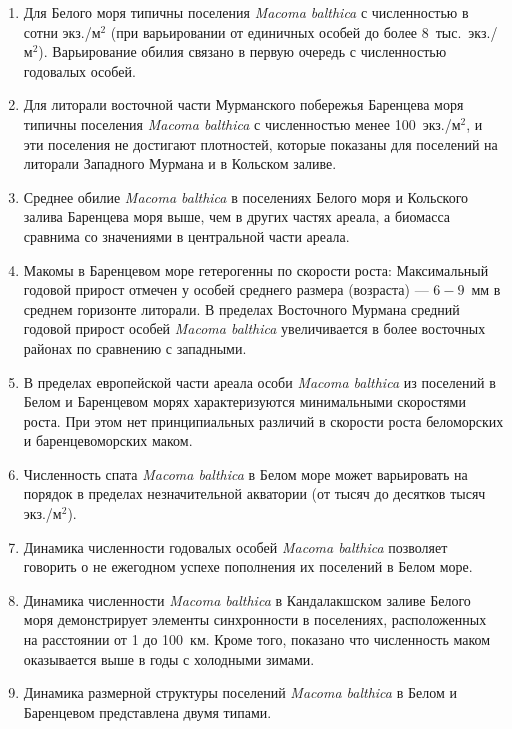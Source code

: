 	\begin{enumerate}
		\item Для Белого моря типичны поселения {\it Macoma balthica} с численностью в сотни экз./м$^2$ (при варьировании от единичных особей до более $8$~тыс.~экз./м$^2$). Варьирование обилия связано в первую очередь с численностью годовалых особей.
		\item Для литорали восточной части Мурманского побережья Баренцева моря типичны поселения {\it Macoma balthica} с численностью  менее 100~экз./м$^2$, и эти поселения не достигают плотностей, которые показаны для поселений на литорали Западного Мурмана и в Кольском заливе. %
		\item Среднее обилие {\it Macoma balthica} в поселениях Белого моря и Кольского залива Баренцева моря выше, чем в других частях ареала, а биомасса сравнима со значениями в центральной части ареала. 
		\item Макомы в Баренцевом море гетерогенны по скорости роста: Максимальный годовой прирост отмечен у особей среднего размера (возраста) --- $6 - 9$~мм в среднем горизонте литорали. В пределах Восточного Мурмана средний годовой прирост особей {\it Macoma balthica} увеличивается в более восточных районах по сравнению с западными.
		\item В пределах европейской части ареала особи {\it Macoma balthica} из поселений в Белом и Баренцевом морях характеризуются минимальными скоростями роста. При этом нет принципиальных различий в скорости роста беломорских и баренцевоморских маком.
		\item Численность спата {\it Macoma balthica} в Белом море может варьировать на порядок в пределах незначительной акватории (от тысяч до десятков тысяч экз./м$^2$).
		\item Динамика численности годовалых особей {\it Macoma balthica} позволяет говорить о не ежегодном успехе пополнения их поселений в Белом море.
		\item Динамика численности {\it Macoma balthica} в Кандалакшском заливе Белого моря демонстрирует элементы синхронности в поселениях, расположенных на расстоянии от 1 до 100~км. Кроме того, показано что численность маком оказывается выше в годы с холодными зимами.
		\item Динамика размерной структуры поселений {\it Macoma balthica} в Белом и Баренцевом представлена двумя типами. \\

\end{enumerate}
